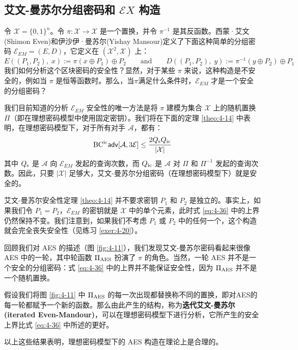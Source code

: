 \subsection{艾文-曼苏尔分组密码和 $\mathcal{E}X$ 构造}\label{subsec:4-7-3}

令 $\mathcal{X}=\{0,1\}^n$。令 $\pi:\mathcal{X}\to\mathcal{X}$ 是一个置换，并令 $\pi^{-1}$ 是其反函数。西蒙·艾文(Shimon Even)和伊沙伊·曼苏尔(Yishay Mansour)定义了下面这种简单的分组密码 $\mathcal{E}_{EM}=(E,D)$，它定义在 $(\mathcal{X}^2,\mathcal{X})$ 上：
\begin{equation}\label{eq:4-35}
E((P_1,P_2),\;x):=\pi(x\oplus P_1)\oplus P_2
\quad\quad\text{and}\quad\quad
D((P_1,P_2),\;y):=\pi^{-1}(y\oplus P_2)\oplus P_1
\end{equation}
我们如何分析这个区块密码的安全性？显然，对于某些 $\pi$ 来说，这种构造是不安全的，例如当 $\pi$ 是恒等函数时。那么，当$\pi$满足什么条件时，$\mathcal{E}_{EM}$ 才是一个安全的分组密码？

我们目前知道的分析 $\mathcal{E}_{EM}$ 安全性的唯一方法是将 $\pi$ 建模为集合 $\mathcal{X}$ 上的随机置换 $\Pi$（即在理想密码模型中使用固定密钥）。我们将在下面的定理 \ref{theo:4-14} 中表明，在理想密码模型下，对于所有对手 $\mathcal{A}$，都有：
\begin{equation}\label{eq:4-36}
{\rm BC^{ic}\mathsf{adv}}[\mathcal{A},3\mathcal{E}]\leq\frac{2Q_{\rm s}Q_{\rm ic}}{|\mathcal{X}|}
\end{equation}
其中 $Q_{\rm s}$ 是 $\mathcal{A}$ 向 $\mathcal{E}_{EM}$ 发起的查询次数，而 $Q_{\rm ic}$ 是 $\mathcal{A}$ 对 $\Pi$ 和 $\Pi^{-1}$ 发起的查询次数。因此，只要 $|\mathcal{X}|$ 足够大，艾文-曼苏尔分组密码（在理想密码模型下）就是安全的。

艾文-曼苏尔安全性定理 \ref{theo:4-14} 并不要求密钥 $P_1$ 和 $P_2$ 是独立的。事实上，如果我们令 $P_1=P_2$，$\mathcal{E}_{EM}$ 的密钥就是 $\mathcal{X}$ 中的单个元素，此时式 \ref{eq:4-36} 中的上界仍然保持不变。我们注意到，如果我们不考虑 $P_1$ 或 $P_2$ 中的任何一个，这个构造就会完全丧失安全性（见练习 \ref{exer:4-20}）。

\begin{snote}
回顾我们对 AES 的描述（图 \ref{fig:4-11}），我们发现艾文-曼苏尔密码看起来很像 AES 中的一轮，其中轮函数 $\Pi_{\rm AES}$ 扮演了 $\pi$ 的角色。当然，一轮 AES 并不是一个安全的分组密码：式 \ref{eq:4-36} 中的上界并不能保证安全性，因为 $\Pi_{\rm AES}$ 并不是一个随机置换。

假设我们将图 \ref{fig:4-11} 中 $\Pi_{\rm AES}$ 的每一次出现都替换称不同的置换，即对AES的每一轮都赋予一个新的函数。那么由此产生的结构，称为\textbf{迭代艾文-曼苏尔 (iterated Even-Mandour)}，可以在理想密码模型下进行分析，它所产生的安全上界比式 \ref{eq:4-36} 中所述的更好。

以上这些结果表明，理想密码模型下的 AES 构造在理论上是合理的。
\end{snote}

